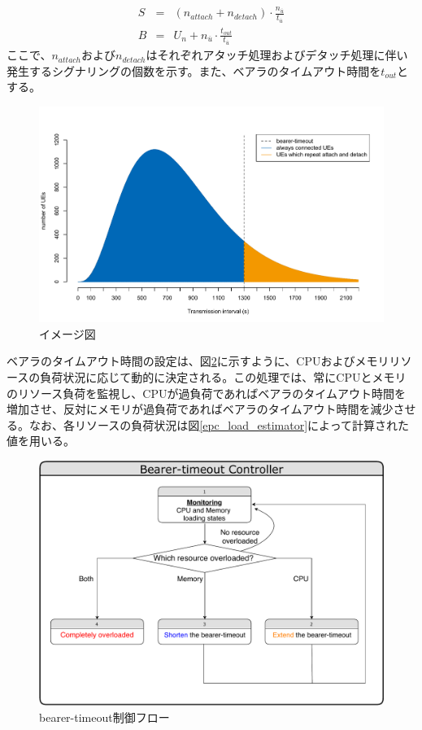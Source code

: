 \documentclass[a4j]{ujarticle}
\begin{document}
\begin{eqnarray}
  S & = & (n_{attach} + n_{detach}) \cdot  \frac{n_{\overline{u}}}{t_{\overline{u}}} \label{eq:s}  \\
	B & = & U_n + n_{\overline{u}} \cdot \frac{t_{out}}{t_{\overline{u}}}
	\label{eq:b}
\end{eqnarray}
ここで、$n_{attach} および n_{detach}$はそれぞれアタッチ処理およびデタッチ処理に伴い発生するシグナリングの個数を示す。また、ベアラのタイムアウト時間を$t_{out}$とする。
\begin{figure}[htbp]
	\centering
	\includegraphics[width=0.7\hsize]{static.pdf}
  \caption{イメージ図}
	\label{static}
\end{figure}

ベアラのタイムアウト時間の設定は、図\ref{bearer-timeout_controller}に示すように、CPUおよびメモリリソースの負荷状況に応じて動的に決定される。この処理では、常にCPUとメモリのリソース負荷を監視し、CPUが過負荷であればベアラのタイムアウト時間を増加させ、反対にメモリが過負荷であればベアラのタイムアウト時間を減少させる。なお、各リソースの負荷状況は図\ref{epc_load_estimator}によって計算された値を用いる。
\begin{figure}[htbp]
	\centering
	\includegraphics[width=0.7\hsize]{bearer-timeout_controller.pdf}
  \caption{bearer-timeout制御フロー}
	\label{bearer-timeout_controller}
\end{figure}
\end{document}
